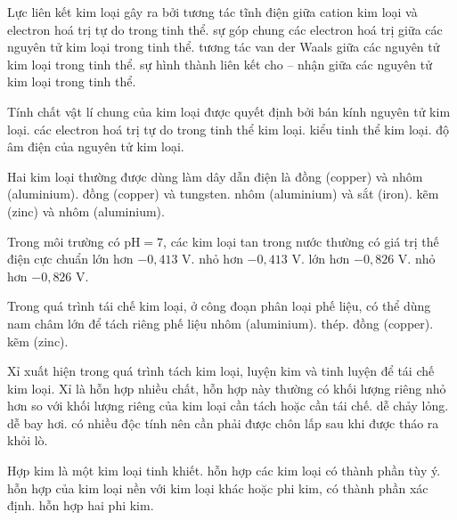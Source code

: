 \documentclass[11pt,a4paper]{article}
\def\loigiai#1{}
\begin{document}
\begin{ex}
Lực liên kết kim loại gây ra bởi
\choice
{tương tác tĩnh điện giữa cation kim loại và electron hoá trị tự do trong tinh thể.}
{sự góp chung các electron hoá trị giữa các nguyên tử kim loại trong tinh thể.}
{tương tác van der Waals giữa các nguyên tử kim loại trong tinh thể.}
{sự hình thành liên kết cho -- nhận giữa các nguyên tử kim loại trong tinh thể.}
\loigiai{}
\end{ex}

\begin{ex}
Tính chất vật lí chung của kim loại được quyết định bởi
\choice
{bán kính nguyên tử kim loại.}
{các electron hoá trị tự do trong tinh thể kim loại.}
{kiểu tinh thể kim loại.}
{độ âm điện của nguyên tử kim loại.}
\loigiai{}
\end{ex}

\begin{ex}
Hai kim loại thường được dùng làm dây dẫn điện là
\choice
{đồng (copper) và nhôm (aluminium).}
{đồng (copper) và tungsten.}
{nhôm (aluminium) và sắt (iron).}
{kẽm (zinc) và nhôm (aluminium).}
\loigiai{}
\end{ex}

\begin{ex}
Trong môi trường có $\text{pH} = 7$, các kim loại tan trong nước thường có giá trị thế điện cực chuẩn
\choice
{lớn hơn $-0{,}413\text{ V}$.}
{nhỏ hơn $-0{,}413\text{ V}$.}
{lớn hơn $-0{,}826\text{ V}$.}
{nhỏ hơn $-0{,}826\text{ V}$.}
\loigiai{}
\end{ex}

\begin{ex}
Trong quá trình tái chế kim loại, ở công đoạn phân loại phế liệu, có thể dùng nam châm lớn để tách riêng phế liệu
\choice
{nhôm (aluminium).}
{thép.}
{đồng (copper).}
{kẽm (zinc).}
\loigiai{}
\end{ex}

\begin{ex}
Xỉ xuất hiện trong quá trình tách kim loại, luyện kim và tinh luyện để tái chế kim loại. Xỉ là hỗn hợp nhiều chất, hỗn hợp này thường
\choice
{có khối lượng riêng nhỏ hơn so với khối lượng riêng của kim loại cần tách hoặc cần tái chế.}
{dễ chảy lỏng.}
{dễ bay hơi.}
{có nhiều độc tính nên cần phải được chôn lấp sau khi được tháo ra khỏi lò.}
\loigiai{}
\end{ex}

\begin{ex}
Hợp kim là
\choice
{một kim loại tinh khiết.}
{hỗn hợp các kim loại có thành phần tùy ý.}
{hỗn hợp của kim loại nền với kim loại khác hoặc phi kim, có thành phần xác định.}
{hỗn hợp hai phi kim.}
\loigiai{}
\end{ex}
\end{document}
